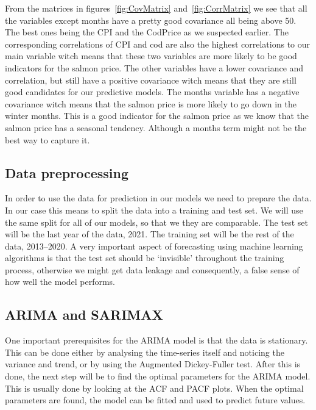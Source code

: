 From the matrices in figures~\ref{fig:CovMatrix} and~\ref{fig:CorrMatrix} we see that all the variables except months have a pretty good covariance all being above 50. The best ones being the CPI and the CodPrice as we suspected earlier. The corresponding correlations of CPI and cod are also the highest correlations to our main variable witch means that these two variables are more likely to be good indicators for the salmon price. The other variables have a lower covariance and correlation, but still have a positive covariance witch means that they are still good candidates for our predictive models. The months variable has a negative covariance witch means that the salmon price is more likely to go down in the winter months. This is a good indicator for the salmon price as we know that the salmon price has a seasonal tendency. Although a months term might not be the best way to capture it.

\subsection{Data preprocessing}
In order to use the data for prediction in our models we need to prepare the data. In our case this means to split the data into a training and test set. We will use the same split for all of our models, so that we they are comparable. The test set will be the last year of the data, 2021. The training set will be the rest of the data, 2013--2020. A very important aspect of forecasting using machine learning algorithms is that the test set should be `invisible' throughout the training process, otherwise we might get data leakage and consequently, a false sense of how well the model performs.~\parencite{brownlee_2016}
\subsection{ARIMA and SARIMAX}\label{ARIMA and SARIMAX Methodology}

One important prerequisites for the ARIMA model is that the data is stationary. This can be done either by analysing the time-series itself and noticing the variance and trend, or by using the Augmented Dickey-Fuller test. 
After this is done, the next step will be to find the optimal parameters for the ARIMA model. This is usually done by looking at the ACF and PACF plots. 
When the optimal parameters are found, the model can be fitted and used to predict future values.~\parencite{hyndman_athanasopoulos_2021}

